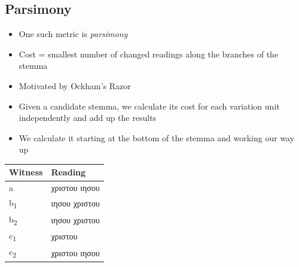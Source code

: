 \documentclass[10pt]{beamer}
\begin{document}
	\subsection{Parsimony}
	\begin{frame}
		\begin{itemize}
			\item One such metric is \emph{parsimony}
			\item Cost = smallest number of changed readings along the branches of the stemma
			\item Motivated by Ockham's Razor
			\item Given a candidate stemma, we calculate its cost for each variation unit independently and add up the results
			\item We calculate it starting at the bottom of the stemma and working our way up
		\end{itemize}
		\begin{center}
			\setmainfont[Ligatures=Common]{EB Garamond}
			\renewfontfamily{}
			\begin{tabular}{|l|l|}
				\hline
				Witness & Reading\\
				\hline
				\hline
				a & {\color{red}\textgreek{χριστου ιησου}}\\
				\hline
				b\textsubscript{1} & {\color{blue}\textgreek{ιησου χριστου}}\\
				\hline
				b\textsubscript{2} & {\color{blue}\textgreek{ιησου χριστου}}\\
				\hline
				c\textsubscript{1} & {\color{darkgreen}\textgreek{χριστου}}\\
				\hline
				c\textsubscript{2} & {\color{red}\textgreek{χριστου ιησου}}\\
				\hline
			\end{tabular}
		\end{center}
	\end{frame}
\end{document}
